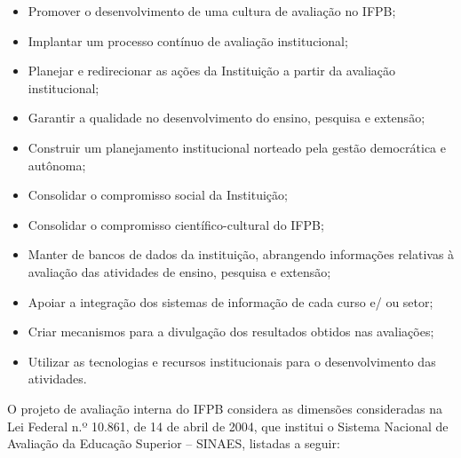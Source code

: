 \begin{itemize}
	\item Promover o desenvolvimento de uma cultura de avaliação no IFPB;

	\item Implantar um processo contínuo de avaliação institucional;

	\item Planejar e redirecionar as ações da Instituição a partir da avaliação institucional;

	\item Garantir a qualidade no desenvolvimento do ensino, pesquisa e extensão;

	\item Construir um planejamento institucional norteado pela gestão democrática e autônoma;

	\item Consolidar o compromisso social da Instituição;

	\item Consolidar o compromisso científico-cultural do IFPB;

	\item Manter de bancos de dados da instituição, abrangendo informações relativas à avaliação das atividades de ensino, pesquisa e extensão;
	
	\item Apoiar a integração dos sistemas de informação de cada curso e/ ou setor;
	
	\item Criar mecanismos para a divulgação dos resultados obtidos nas avaliações;
	
	\item Utilizar as tecnologias e recursos institucionais para o desenvolvimento das atividades.
\end{itemize}
  
		     O projeto de avaliação interna do IFPB considera as dimensões consideradas na Lei Federal n.º 10.861, de 14 de abril de 2004, que institui o Sistema Nacional de Avaliação da Educação Superior – SINAES, listadas a seguir:

